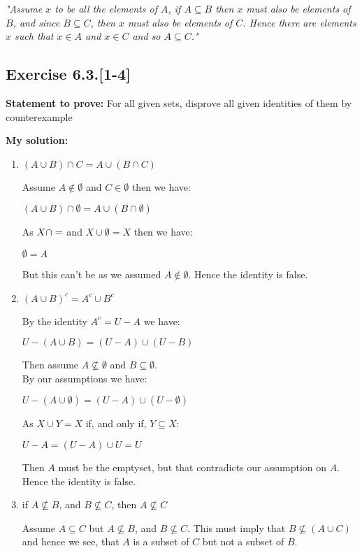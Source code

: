 \documentclass{article}
\newcommand{\cent}[1]{\begin{center}#1\end{center}}
\newcommand{\In}{\! \in \!}
\newcommand{\Prove}{\textbf{Statement to prove: }}
\newcommand{\Solution}{\textbf{My solution: }}
\newcommand{\Exercise}[1]{\subsection*{Exercise #1}}
\begin{document}
	\begin{center}
		\textit{"Assume $ x $ to be all the elements of $ A $, if $ A \subseteq B$ then $x$ must also be elements of $B$, and since $B \subseteq C$, then $x$ must also be elements of $C$. Hence there are elements $x$ such that $ x \In A $ and $ x \In C $ and so $ A \subseteq C $."}
	\end{center}

	\Exercise{6.3.[1-4]}
	
	\Prove
	For all given sets, disprove all given identities of them by counterexample
	
	\Solution
	\begin{enumerate}
		\item $ (A \cup B) \cap C = A \cup (B \cap C) $
		
		Assume $A \notin \emptyset$ and $C \In \emptyset$ then we have:
		
		\cent{$ (A \cup B) \cap \emptyset = A \cup (B \cap \emptyset) $}
		
		As $X \cap \empty = \empty$ and $X \cup \emptyset = X$ then we have:
		
		\cent{$ \emptyset = A $}
		
		But this can't be as we assumed $A \notin \emptyset$. Hence the identity is false.
		
		\item $(A \cup B)^c = A^c \cup B^c$
		
		By the identity $ A^c = U-A $ we have:
		
		\cent{$U - (A \cup B) = (U-A) \cup (U-B)$}
		
		Then assume $A \not \subseteq \emptyset$ and $B \subseteq \emptyset$.\\
		
		By our assumptions we have:
		
		\cent{$ U - (A \cup \emptyset) = (U-A) \cup (U-\emptyset) $}
		
		As $X \cup Y = X$ if, and only if, $Y \subseteq X$:
		
		\cent{$ U - A = (U-A) \cup U = U $}
		
		Then $A$ must be the emptyset, but that contradicts our assumption on $A$. Hence the identity is false.
		
		\item if $ A \not \subseteq B $, and $ B \not \subseteq C $, then $ A \not \subseteq C $
		
		Assume $A \subseteq C$ but $A \not \subseteq B$, and $B \not \subseteq C$. This must imply that $B \not \subseteq (A \cup C)$ and hence we see, that $A$ is a subset of $C$ but not a subset of $B$.
		

\end{enumerate}
\end{document}

